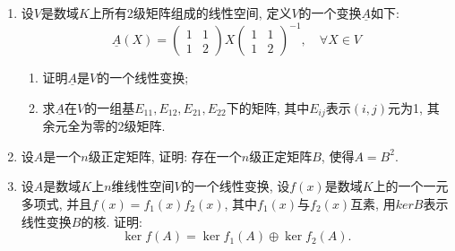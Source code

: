 \documentclass[12pt,a4paper,openany]{book}
\begin{document}
\begin{enumerate}
\item 设$V$是数域$K$上所有2级矩阵组成的线性空间, 定义$V$的一个变换$\underline{A}$如下: 
\[
\underline{A}(X) = 
\begin{pmatrix}
1 & 1 \\
1 & 2
\end{pmatrix}
X
\begin{pmatrix}
1 & 1 \\
1 & 2
\end{pmatrix}^{-1}, \quad \forall X \in V
\]
\begin{enumerate}
\item 证明$\underline{A}$是$V$的一个线性变换;
\item 求$\underline{A}$在$V$的一组基$E_{11}, E_{12}, E_{21}, E_{22}$下的矩阵, 其中$E_{ij}$表示$(i, j)$元为1, 其余元全为零的2级矩阵.
\end{enumerate}

\item 设$A$是一个$n$级正定矩阵, 证明: 存在一个$n$级正定矩阵$B$, 使得$A = B^2$.

\item 设$A$是数域$K$上$n$维线性空间$V$的一个线性变换, 设$f(x)$是数域$K$上的一个一元多项式, 并且$f(x) = f_1(x)f_2(x)$, 其中$f_1(x)$与$f_2(x)$互素, 用$ker{B}$表示线性变换$B$的核. 证明:
\[
\ker{f(A)} = \ker{f_1(A)} \oplus \ker{f_2(A)}.
\]
\end{enumerate}
\end{document}
